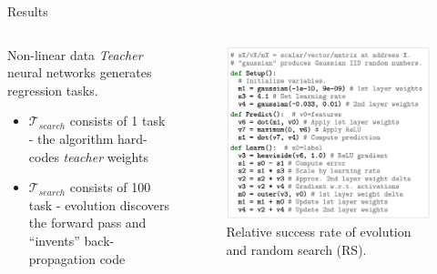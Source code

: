 \documentclass{beamer}
\begin{document}
\begin{frame}{Results}
\begin{columns}

    \begin{column}{0.48\textwidth}
    
    \begin{block}{Non-linear data}
        \textit{Teacher} neural networks generates regression tasks.

        \begin{itemize}
            \item $\mathcal{T}_{search}$ consists of 1 task - the algorithm hard-codes \textit{teacher} weights
            \item $\mathcal{T}_{search}$ consists of 100 task - evolution discovers the forward pass and “invents” back-propagation code
        \end{itemize}
    
    \end{block}

    \end{column}

    \begin{column}{0.5\textwidth}
        
    
    \begin{figure}
        \centering
        \includegraphics[scale=0.15]{neuralnet.png}
        \caption{Relative success rate of evolution and random search (RS).}
        \label{fig:nn}
    \end{figure}
    \end{column}
\end{columns}
\end{frame}
\end{document}
